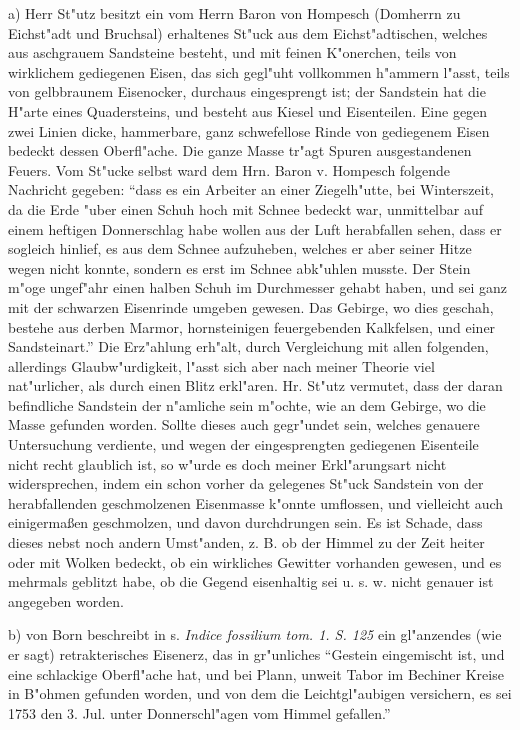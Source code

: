 \documentclass[a4paper, 11pt, oneside, polutonikogreek, german]{article}
\begin{document}
a) Herr St"utz besitzt ein vom Herrn Baron von Hompesch (Domherrn zu Eichst"adt und Bruchsal) erhaltenes St"uck aus dem Eichst"adtischen, welches aus aschgrauem Sandsteine besteht, und mit feinen K"onerchen, teils von wirklichem gediegenen Eisen, das sich gegl"uht vollkommen h"ammern l"asst, teils von gelbbraunem Eisenocker, durchaus eingesprengt ist; der Sandstein hat die H"arte eines Quadersteins, und besteht aus Kiesel und Eisenteilen. Eine gegen zwei Linien dicke, hammerbare, ganz schwefellose Rinde von gediegenem Eisen bedeckt dessen Oberfl"ache. Die ganze Masse tr"agt Spuren ausgestandenen Feuers. Vom St"ucke selbst ward dem Hrn. Baron v. Hompesch folgende Nachricht gegeben: "`dass es ein Arbeiter an einer Ziegelh"utte, bei Winterszeit, da die Erde "uber einen Schuh hoch mit Schnee bedeckt war, unmittelbar auf einem heftigen Donnerschlag habe wollen aus der Luft herabfallen sehen, dass er sogleich hinlief, es aus dem Schnee aufzuheben, welches er aber seiner Hitze wegen nicht konnte, sondern es erst im Schnee abk"uhlen musste. Der Stein m"oge ungef"ahr einen halben Schuh im Durchmesser gehabt haben, und sei ganz mit der schwarzen Eisenrinde umgeben gewesen. Das Gebirge, wo dies geschah, bestehe aus derben Marmor, hornsteinigen feuergebenden Kalkfelsen, und einer Sandsteinart."' Die Erz"ahlung erh"alt, durch Vergleichung mit allen folgenden, allerdings Glaubw"urdigkeit, l"asst sich aber nach meiner Theorie viel nat"urlicher, als durch einen Blitz erkl"aren. Hr. St"utz vermutet, dass der daran befindliche Sandstein der n"amliche sein m"ochte, wie an dem Gebirge, wo die Masse gefunden worden. Sollte dieses auch gegr"undet sein, welches genauere Untersuchung verdiente, und wegen der eingesprengten gediegenen Eisenteile nicht recht glaublich ist, so w"urde es doch meiner Erkl"arungsart nicht widersprechen, indem ein schon vorher da gelegenes St"uck Sandstein von der herabfallenden geschmolzenen Eisenmasse k"onnte umflossen, und vielleicht auch einigermaßen geschmolzen, und davon durchdrungen sein. Es ist Schade, dass dieses nebst noch andern Umst"anden, z. B. ob der Himmel zu der Zeit heiter oder mit Wolken bedeckt, ob ein wirkliches Gewitter vorhanden gewesen, und es mehrmals geblitzt habe, ob die Gegend eisenhaltig sei u. s. w. nicht genauer ist angegeben worden.

b) von Born beschreibt in s. \emph{Indice fossilium tom. 1. S. 125} ein gl"anzendes (wie er sagt) retrakterisches Eisenerz, das in gr"unliches "`Gestein eingemischt ist, und eine schlackige Oberfl"ache hat, und bei Plann, unweit Tabor im Bechiner Kreise in B"ohmen gefunden worden, und von dem die Leichtgl"aubigen versichern, es sei 1753 den 3. Jul. unter Donnerschl"agen vom Himmel gefallen."'
\end{document}
